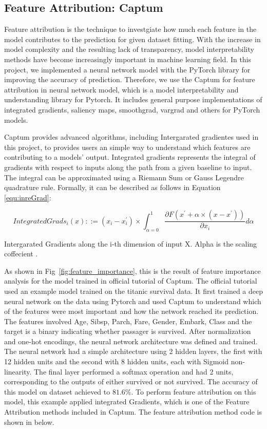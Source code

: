 \documentclass[final-report]{report-template}
\begin{document}
\subsection{Feature Attribution: Captum}
Feature attribution is the technique to investgiate how much each feature in the model contributes to the prediction for given dataset fitting. 
With the increase in model complexity and the resulting lack of transparency, model interpretability methods have become increasingly important in machine learning field.
In this project, we implemented a neural network model with the PyTorch library \citep{PyTorch} for improving the accuracy of prediction. Therefore, we use the Captum for feature attribution in neural network model, which is a model interpretability and understanding library for Pytorch.
It includes general purpose implementations of integrated gradients, saliency maps, smoothgrad, vargrad and others for PyTorch models.

Captum provides advanced algorithms, including Intergarated gradientes used in this project, to provides users an simple way to understand which features are contributing to a models' output.
Integrated gradients represents the integral of gradients with respect to inputs along the path from a given baseline to input. The integral can be approximated using a Riemann Sum or Gauss Legendre quadrature rule. Formally, it can be described as follows in Equation \eqref{equ:inreGrad}:

\begin{equation}
    IntegratedGrads_{i}(x) ::= (x_{i} - x_{i}^{'}) \times 	\int_{\alpha=0}^1 \frac{\partial F(x^{'}+\alpha \times (x-x^{'}))}{\partial x_{i}} d\alpha  \label{equ:inreGrad}    
\end{equation}

Intergarated Gradients along the i-th dimension of input X. Alpha is the scaling coffecient \citep{sundararajan2017axiomatic}.

As shown in Fig~\ref{fig:feature_importance}, this is the result of feature importance analysis for the model trained in official tutorial of Captum.
The official tutorial used an example model trained on the titanic survival data. 
It first trained a deep neural network on the data using Pytorch and used Captum to understand which of the features were most important and how the network reached its prediction.
The features involved Age, Sibsp, Parch, Fare, Gender, Embark, Class and the target is a binary indicating whether passager is survived. After normalization and one-hot encodings, the neural network architecture was defined and trained. 
The neural network had a simple architecture using 2 hidden layers, the first with 12 hidden units and the second with 8 hidden units, each with Sigmoid non-linearity.
The final layer performed a softmax operation and had 2 units, corresponding to the outputs of either survived or not survived. The accuracy of this model on dataset achieved to $81.6\%$. To perform feature attribution on this model, this example applied integrated Gradients, which is one of the Feature Attribution methods included in Captum. The feature attribution method code is shown in below.
\end{document}
